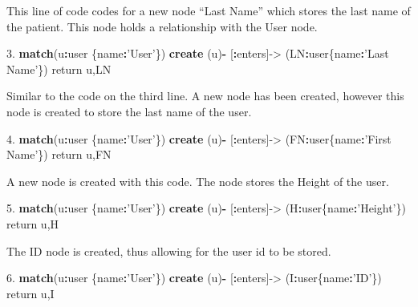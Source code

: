 \documentclass[]{book}
\newenvironment{Shaded}{\begin{snugshade}}{\end{snugshade}}
\newcommand{\KeywordTok}[1]{\textcolor[rgb]{0.13,0.29,0.53}{\textbf{#1}}}
\newcommand{\FloatTok}[1]{\textcolor[rgb]{0.00,0.00,0.81}{#1}}
\newcommand{\StringTok}[1]{\textcolor[rgb]{0.31,0.60,0.02}{#1}}
\newcommand{\OperatorTok}[1]{\textcolor[rgb]{0.81,0.36,0.00}{\textbf{#1}}}
\newcommand{\NormalTok}[1]{#1}
\begin{document}
This line of code codes for a new node ``Last Name'' which stores the
last name of the patient. This node holds a relationship with the User
node.

\begin{Shaded}
\begin{Highlighting}[]
\FloatTok{3.} \KeywordTok{match}\NormalTok{(u}\OperatorTok{:}\NormalTok{user \{name}\OperatorTok{:}\StringTok{'User'}\NormalTok{\}) }\KeywordTok{create}\NormalTok{ (u)}\OperatorTok{-}\StringTok{ }\NormalTok{[}\OperatorTok{:}\NormalTok{enters]->}\StringTok{ }\NormalTok{(LN}\OperatorTok{:}\NormalTok{user\{name}\OperatorTok{:}\StringTok{'Last Name'}\NormalTok{\}) return u,LN}
\end{Highlighting}
\end{Shaded}

Similar to the code on the third line. A new node has been created,
however this node is created to store the last name of the user.

\begin{Shaded}
\begin{Highlighting}[]
\FloatTok{4.} \KeywordTok{match}\NormalTok{(u}\OperatorTok{:}\NormalTok{user \{name}\OperatorTok{:}\StringTok{'User'}\NormalTok{\}) }\KeywordTok{create}\NormalTok{ (u)}\OperatorTok{-}\StringTok{ }\NormalTok{[}\OperatorTok{:}\NormalTok{enters]->}\StringTok{ }\NormalTok{(FN}\OperatorTok{:}\NormalTok{user\{name}\OperatorTok{:}\StringTok{'First Name'}\NormalTok{\}) return u,FN}
\end{Highlighting}
\end{Shaded}

A new node is created with this code. The node stores the Height of the
user.

\begin{Shaded}
\begin{Highlighting}[]
\FloatTok{5.} \KeywordTok{match}\NormalTok{(u}\OperatorTok{:}\NormalTok{user \{name}\OperatorTok{:}\StringTok{'User'}\NormalTok{\}) }\KeywordTok{create}\NormalTok{ (u)}\OperatorTok{-}\StringTok{ }\NormalTok{[}\OperatorTok{:}\NormalTok{enters]->}\StringTok{ }\NormalTok{(H}\OperatorTok{:}\NormalTok{user\{name}\OperatorTok{:}\StringTok{'Height'}\NormalTok{\}) return u,H}
\end{Highlighting}
\end{Shaded}

The ID node is created, thus allowing for the user id to be stored.

\begin{Shaded}
\begin{Highlighting}[]
\FloatTok{6.} \KeywordTok{match}\NormalTok{(u}\OperatorTok{:}\NormalTok{user \{name}\OperatorTok{:}\StringTok{'User'}\NormalTok{\}) }\KeywordTok{create}\NormalTok{ (u)}\OperatorTok{-}\StringTok{ }\NormalTok{[}\OperatorTok{:}\NormalTok{enters]->}\StringTok{ }\NormalTok{(I}\OperatorTok{:}\NormalTok{user\{name}\OperatorTok{:}\StringTok{'ID'}\NormalTok{\}) return u,I}
\end{Highlighting}
\end{Shaded}
\end{document}
